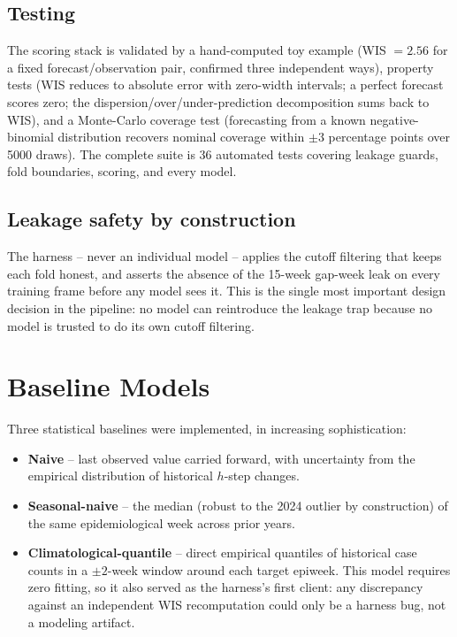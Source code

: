 \documentclass[11pt]{report}
\begin{document}
\section{Testing}
The scoring stack is validated by a hand-computed toy example (WIS $=2.56$ for a fixed forecast/observation pair, confirmed three independent ways), property tests (WIS reduces to absolute error with zero-width intervals; a perfect forecast scores zero; the dispersion/over/under-prediction decomposition sums back to WIS), and a Monte-Carlo coverage test (forecasting from a known negative-binomial distribution recovers nominal coverage within $\pm 3$ percentage points over 5000 draws). The complete suite is 36 automated tests covering leakage guards, fold boundaries, scoring, and every model.

\section{Leakage safety by construction}
The harness -- never an individual model -- applies the cutoff filtering that keeps each fold honest, and asserts the absence of the 15-week gap-week leak on every training frame before any model sees it. This is the single most important design decision in the pipeline: no model can reintroduce the leakage trap because no model is trusted to do its own cutoff filtering.

\chapter{Baseline Models}

Three statistical baselines were implemented, in increasing sophistication:
\begin{itemize}
\item \textbf{Naive} -- last observed value carried forward, with uncertainty from the empirical distribution of historical $h$-step changes.
\item \textbf{Seasonal-naive} -- the median (robust to the 2024 outlier by construction) of the same epidemiological week across prior years.
\item \textbf{Climatological-quantile} -- direct empirical quantiles of historical case counts in a $\pm2$-week window around each target epiweek. This model requires zero fitting, so it also served as the harness's first client: any discrepancy against an independent WIS recomputation could only be a harness bug, not a modeling artifact.
\end{itemize}
\end{document}
